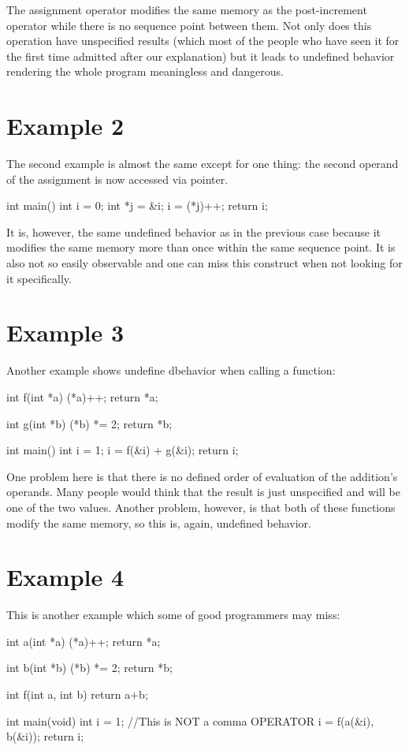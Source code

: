 The assignment operator modifies the same memory as the post-increment operator while there is no sequence point between them. Not only does this operation have unspecified results (which most of the people who have seen it for the first time admitted after our explanation) but it leads to undefined behavior rendering the whole program meaningless and dangerous.

\section{Example 2}\label{example2}
The second example is almost the same except for one thing: the second operand of the assignment is now accessed via pointer.
\\\begin{code}
int main(){
	int i = 0;
	int *j = &i;
	i = (*j)++;
    return i;
}
\end{code}\label{example2}

It is, however, the same undefined behavior as in the previous case because it modifies the same memory more than once within the same sequence point. It is also not so easily observable and one can miss this construct when not looking for it specifically.

\section{Example 3}\label{example3}
Another example shows undefine dbehavior when calling a function:
\\\begin{code}
int f(int *a){
    (*a)++;
    return *a;
}

int g(int *b){
    (*b) *= 2;
    return *b;
}

int main(){
    int i = 1;
    i = f(&i) + g(&i);
    return i;
}
\end{code}\label{example3}

One problem here is that there is no defined order of evaluation of the addition's operands. Many people would think that the result is just unspecified and will be one of the two values. Another problem, however, is that both of these functions modify the same memory, so this is, again, undefined behavior.

\section{Example 4}\label{example4}
This is another example which some of good programmers may miss:
\\\begin{code}
int a(int *a){
    (*a)++;
    return *a;
}

int b(int *b){
    (*b) *= 2;
    return *b;
}

int f(int a, int b){
    return a+b;
}

int main(void){
    int i = 1;
    //This is NOT a comma OPERATOR
    i = f(a(&i), b(&i));
    return i;
}
\end{code}

